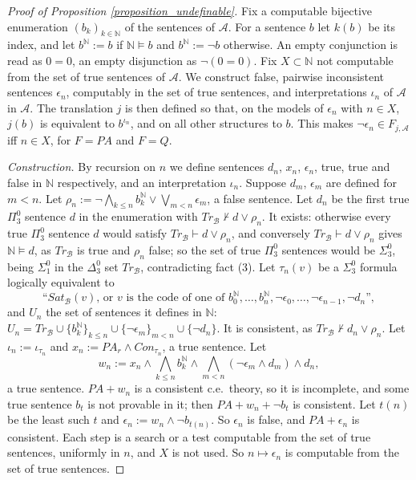 \documentclass{amsart}  %
\numberwithin{equation}{section}
\theoremstyle{definition}
\theoremstyle{remark}
\begin{document}
\begin{proof} [Proof of Proposition \ref{proposition_undefinable}]
Fix a computable bijective enumeration $(b _{k}) _{k \in \mathbb{N}}$ of the sentences of $\mathcal{A}$. For a sentence $b$ let $k (b)$ be its index, and let $b ^{\mathbb{N}} := b$ if $\mathbb{N} \models b$ and $b ^{\mathbb{N}} := \neg b$ otherwise. An empty conjunction is read as $0 = 0$, an empty disjunction as $\neg (0 = 0)$. Fix $X \subset \mathbb{N}$ not computable from the set of true sentences of $\mathcal{A}$. We construct false, pairwise inconsistent sentences $\epsilon _{n}$, computably in the set of true sentences, and interpretations $\iota _{n}$ of $\mathcal{A}$ in $\mathcal{A}$. The translation $j$ is then defined so that, on the models of $\epsilon _{n}$ with $n \in X$, $j (b)$ is equivalent to $b ^{\iota _{n}}$, and on all other structures to $b$. This makes $\neg \epsilon _{n} \in F _{j, \mathcal{A}}$ iff $n \in X$, for $F = PA$ and $F = Q$.

\emph{Construction.} By recursion on $n$ we define sentences $d _{n}$, $x _{n}$, $\epsilon _{n}$, true, true and false in $\mathbb{N}$ respectively, and an interpretation $\iota _{n}$. Suppose $d _{m}$, $\epsilon _{m}$ are defined for $m < n$. Let $\rho _{n} := \neg \bigwedge _{k \leq n} b _{k} ^{\mathbb{N}} \lor \bigvee _{m < n} \epsilon _{m}$, a false sentence. Let $d _{n}$ be the first true $\Pi ^{0} _{3}$ sentence $d$ in the enumeration with $Tr _{\mathcal{B}} \nvdash d \lor \rho _{n}$. It exists: otherwise every true $\Pi ^{0} _{3}$ sentence $d$ would satisfy $Tr _{\mathcal{B}} \vdash d \lor \rho _{n}$, and conversely $Tr _{\mathcal{B}} \vdash d \lor \rho _{n}$ gives $\mathbb{N} \models d$, as $Tr _{\mathcal{B}}$ is true and $\rho _{n}$ false; so the set of true $\Pi ^{0} _{3}$ sentences would be $\Sigma ^{0} _{3}$, being $\Sigma ^{0} _{1}$ in the $\Delta ^{0} _{3}$ set $Tr _{\mathcal{B}}$, contradicting fact (3). Let $\tau _{n} (v)$ be a $\Sigma ^{0} _{3}$ formula logically equivalent to
$$\text{``$Sat _{\mathcal{B}} (v)$, or $v$ is the code of one of $b _{0} ^{\mathbb{N}}, \ldots, b _{n} ^{\mathbb{N}}, \neg \epsilon _{0}, \ldots, \neg \epsilon _{n-1}, \neg d _{n}$''},$$
and $U _{n}$ the set of sentences it defines in $\mathbb{N}$: $U _{n} = Tr _{\mathcal{B}} \cup \{b _{k} ^{\mathbb{N}}\} _{k \leq n} \cup \{\neg \epsilon _{m}\} _{m < n} \cup \{\neg d _{n}\}$. It is consistent, as $Tr _{\mathcal{B}} \nvdash d _{n} \lor \rho _{n}$. Let $\iota _{n} := \iota _{\tau _{n}}$ and $x _{n} := PA _{r} \land Con _{\tau _{n}}$, a true sentence. Let
$$w _{n} := x _{n} \land \bigwedge _{k \leq n} b _{k} ^{\mathbb{N}} \land \bigwedge _{m < n} (\neg \epsilon _{m} \land d _{m}) \land d _{n},$$
a true sentence. $PA + w _{n}$ is a consistent c.e.\ theory, so it is incomplete, and some true sentence $b _{t}$ is not provable in it; then $PA + w _{n} + \neg b _{t}$ is consistent. Let $t (n)$ be the least such $t$ and $\epsilon _{n} := w _{n} \land \neg b _{t (n)}$. So $\epsilon _{n}$ is false, and $PA + \epsilon _{n}$ is consistent. Each step is a search or a test computable from the set of true sentences, uniformly in $n$, and $X$ is not used. So $n \mapsto \epsilon _{n}$ is computable from the set of true sentences.


\end{proof}
\end{document}
